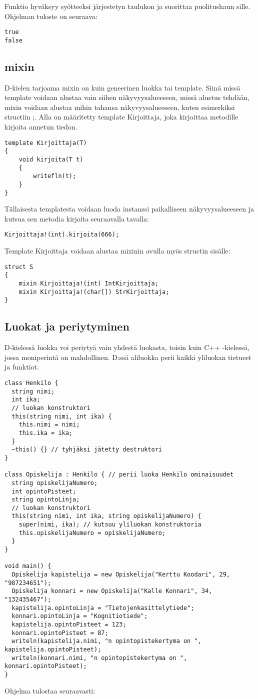 \documentclass[11pt,oneside,a4paper]{article}
\begin{document}
Funktio hyväksyy syötteeksi järjestetyn taulukon ja suorittaa puolitushaun
sille. Ohjelman tuloste on seuraava:
\begin{verbatim}
true
false
\end{verbatim}

\subsection{mixin}
D-kielen tarjoama mixin on kuin geneerinen luokka tai template. Siinä missä
template voidaan alustaa vain siihen
näkyvyysalueeseen, missä alustus tehdään, mixin voidaan alustaa mihin
tahansa näkyvyysalueeseen, kuten esimerkiksi structiin \cite{DLA13};\cite{ALE10}. Alla on
määritetty template Kirjoittaja, joka kirjoittaa metodille kirjoita annetun
tiedon. 
\begin{verbatim}
template Kirjoittaja(T)
{
    void kirjoita(T t)
    {
        writefln(t);
    }
}
\end{verbatim}
Tällaisesta templatesta voidaan luoda instanssi paikalliseen näkyvyysalueeseen ja
kutsua sen metodia kirjoita seuraavalla tavalla:
\begin{verbatim}
Kirjoittaja!(int).kirjoita(666); 
\end{verbatim}
Template Kirjoittaja voidaan alustaa mixinin avulla myös structin sisälle:
\begin{verbatim}
struct S
{
    mixin Kirjoittaja!(int) IntKirjoittaja;
    mixin Kirjoittaja!(char[]) StrKirjoittaja;
} 
\end{verbatim}

\subsection{Luokat ja periytyminen}
D-kielessä luokka voi periytyä vain yhdestä luokasta, toisin kuin C++ -kielessä,
jossa moniperintä on mahdollinen. D:ssä aliluokka perii kaikki yliluokan
tietueet ja funktiot. 
\begin{verbatim}
class Henkilo {
  string nimi;
  int ika;
  // luokan konstruktori
  this(string nimi, int ika) {
    this.nimi = nimi;
    this.ika = ika;
  }
  ~this() {} // tyhjäksi jätetty destruktori
}

class Opiskelija : Henkilo { // perii luoka Henkilo ominaisuudet
  string opiskelijaNumero;
  int opintoPisteet;
  string opintoLinja;
  // luokan konstruktori
  this(string nimi, int ika, string opiskelijaNumero) { 
    super(nimi, ika); // kutsuu yliluokan konstruktoria
    this.opiskelijaNumero = opiskelijaNumero;
  }
}

void main() {
  Opiskelija kapistelija = new Opiskelija("Kerttu Koodari", 29, "987234651");
  Opiskelija konnari = new Opiskelija("Kalle Konnari", 34, "132435467");
  kapistelija.opintoLinja = "Tietojenkasittelytiede";
  konnari.opintoLinja = "Kognitiotiede";
  kapistelija.opintoPisteet = 123;
  konnari.opintoPisteet = 87;
  writeln(kapistelija.nimi, "n opintopistekertyma on ",
kapistelija.opintoPisteet);
  writeln(konnari.nimi, "n opintopistekertyma on ", konnari.opintoPisteet);
}
\end{verbatim}
Ohjelma tulostaa seuraavasti:
\end{document}
